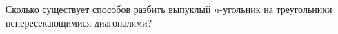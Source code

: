 Сколько существует способов разбить выпуклый $n$-угольник на треугольники непересекающимися диагоналями?